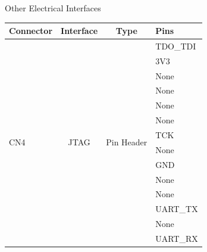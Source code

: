 \begin{frame}{Other Electrical Interfaces}

    \begin{table}[!htb]\tiny
        \centering
        \label{tab:icd}
        \begin{tabular}{lccl}
            \toprule[1.5pt]
            \textbf{Connector} & \textbf{Interface} & \textbf{Type} & \textbf{Pins} \\
            \midrule
            \multirow{14}{*}{CN4} & \multirow{14}{*}{JTAG} & \multirow{14}{*}{Pin Header} & TDO\_TDI \\
                                  &                        &                              & 3V3 \\
                                  &                        &                              & None \\
                                  &                        &                              & None \\
                                  &                        &                              & None \\
                                  &                        &                              & None \\
                                  &                        &                              & TCK \\
                                  &                        &                              & None \\
                                  &                        &                              & GND \\
                                  &                        &                              & None \\
                                  &                        &                              & None \\
                                  &                        &                              & UART\_TX \\
                                  &                        &                              & None \\
                                  &                        &                              & UART\_RX \\

            \bottomrule[1.5pt]
        \end{tabular}
    \end{table}

\end{frame}

